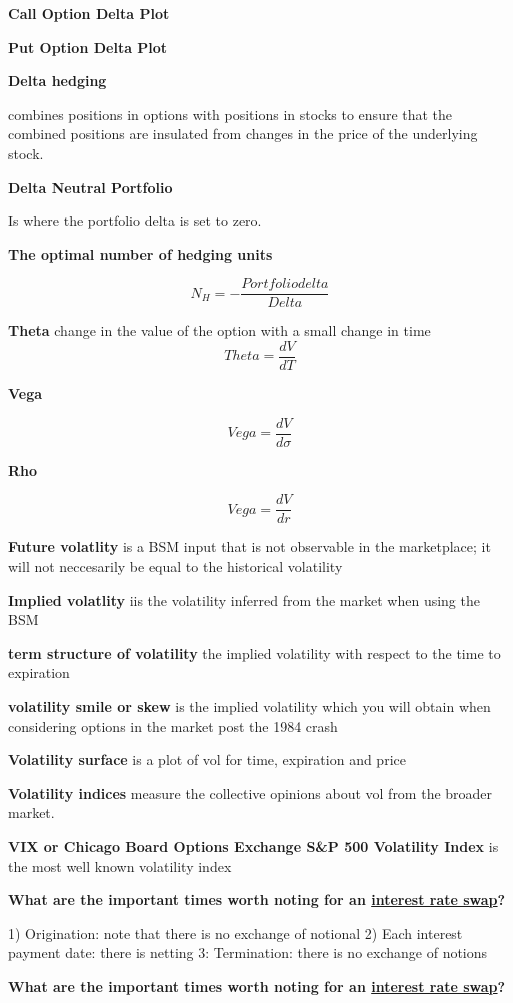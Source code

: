 \documentclass[12pt]{article}
\begin{document}
\textbf{Call Option Delta Plot}

\textbf{Put Option Delta Plot}

\textbf{Delta hedging}

combines positions in options with positions in stocks to ensure that the combined positions are insulated from changes in the price of the underlying stock. 

\textbf{Delta Neutral Portfolio}

Is where the portfolio delta is set to zero. 

\textbf{The optimal number of hedging units}

$$
N_H = - \dfrac{Portfolio delta}{Delta}
$$

\textbf{Theta}
change in the value of the option with a small change in time
$$
Theta = \dfrac{d V}{d T}
$$

\textbf{Vega}

$$
Vega = \dfrac{d V}{d \sigma}
$$

\textbf{Rho}

$$
Vega = \dfrac{d V}{d r}
$$

\textbf{Future volatlity} is a BSM input that is not observable in the marketplace; it will not neccesarily be equal to the historical volatility

\textbf{Implied volatlity} iis the volatility inferred from the market when using the BSM

\textbf{term structure of volatility} the implied volatility with respect to the time to expiration

\textbf{volatility smile or skew} is the implied volatility which you will obtain when considering options in the market post the 1984 crash

\textbf{Volatility surface} is a plot of vol for time, expiration and price

\textbf{Volatility indices} measure the collective opinions about vol from the broader market. 

\textbf{VIX or Chicago Board Options Exchange S\&P 500 Volatility Index} is the most well known volatility index

\newpage

\textbf{What are the important times worth noting for an \underline{interest rate swap}?}

1) Origination: note that there is no exchange of notional
2) Each interest payment date: there is netting
3: Termination: there is no exchange of notions

\textbf{What are the important times worth noting for an \underline{interest rate swap}?}
\end{document}
